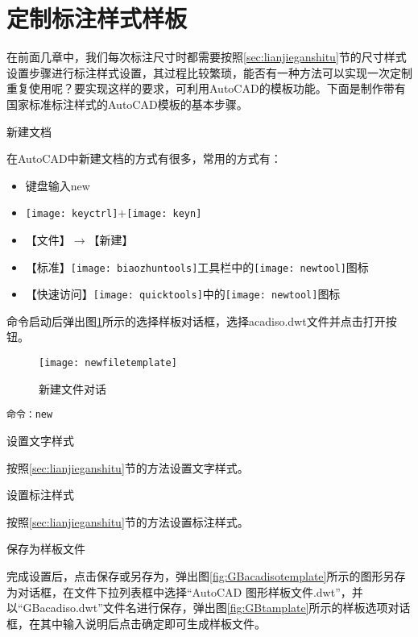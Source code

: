 \section{定制标注样式样板}
在前面几章中，我们每次标注尺寸时都需要按照\ref{sec:lianjieganshitu}节的尺寸样式设置步骤进行标注样式设置，其过程比较繁琐，能否有一种方法可以实现一次定制重复使用呢？要实现这样的要求，可利用AutoCAD的模板功能。下面是制作带有国家标准标注样式的AutoCAD模板的基本步骤。
\begin{procedure}
\item 新建文档

在AutoCAD中新建文档的方式有很多，常用的方式有：
\begin{itemize}
\item 键盘输入new
\item \texttt{[image: keyctrl]}+\texttt{[image: keyn]}
\item 【文件】$\rightarrow $【新建】
\item 【标准】\texttt{[image: biaozhuntools]}工具栏中的\texttt{[image: newtool]}图标
\item 【快速访问】\texttt{[image: quicktools]}中的\texttt{[image: newtool]}图标
\end{itemize}

命令启动后弹出图\ref{fig:newfiletemplate}所示的选择样板对话框，选择acadiso.dwt文件并点击打开按钮。

\begin{figure}[htbp]
\centering
\texttt{[image: newfiletemplate]}
\caption{新建文件对话}\label{fig:newfiletemplate}
\end{figure}

\begin{lstlisting}
命令：new
\end{lstlisting}

\item 设置文字样式

按照\ref{sec:lianjieganshitu}节的方法设置文字样式。

\item 设置标注样式

按照\ref{sec:lianjieganshitu}节的方法设置标注样式。

\item 保存为样板文件

完成设置后，点击保存或另存为，弹出图\ref{fig:GBacadisotemplate}所示的图形另存为对话框，在文件下拉列表框中选择“AutoCAD 图形样板文件.dwt”，并以“GBacadiso.dwt”文件名进行保存，弹出图\ref{fig:GBtamplate}所示的样板选项对话框，在其中输入说明后点击确定即可生成样板文件。



\end{procedure}

